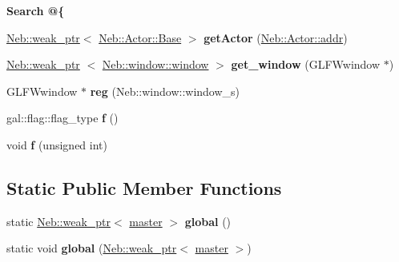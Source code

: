 \begin{Indent}{\bf \-Search @\{}\par
\begin{DoxyCompactItemize}
\item 
\hypertarget{classNeb_1_1master_a5e904cfb101128c317df8ae8909a76d0}{\hyperlink{classNeb_1_1weak__ptr}{\-Neb\-::weak\-\_\-ptr}$<$ \hyperlink{classNeb_1_1Actor_1_1Base}{\-Neb\-::\-Actor\-::\-Base} $>$ {\bfseries get\-Actor} (\hyperlink{classNeb_1_1Actor_1_1addr}{\-Neb\-::\-Actor\-::addr})}\label{classNeb_1_1master_a5e904cfb101128c317df8ae8909a76d0}

\item 
\hypertarget{classNeb_1_1master_a52f234f4ba1485910dc1590f7e0b8c33}{\hyperlink{classNeb_1_1weak__ptr}{\-Neb\-::weak\-\_\-ptr}\*
$<$ \hyperlink{classNeb_1_1window_1_1window}{\-Neb\-::window\-::window} $>$ {\bfseries get\-\_\-window} (\-G\-L\-F\-Wwindow $\ast$)}\label{classNeb_1_1master_a52f234f4ba1485910dc1590f7e0b8c33}

\item 
\hypertarget{classNeb_1_1master_a6548ef5ff871fec6dc28d3b3fa44c159}{\-G\-L\-F\-Wwindow $\ast$ {\bfseries reg} (\-Neb\-::window\-::window\-\_\-s)}\label{classNeb_1_1master_a6548ef5ff871fec6dc28d3b3fa44c159}

\item 
\hypertarget{classNeb_1_1master_a4ccf2ce1e6c39834544f2a015a7f2b7f}{gal\-::flag\-::flag\-\_\-type {\bfseries f} ()}\label{classNeb_1_1master_a4ccf2ce1e6c39834544f2a015a7f2b7f}

\item 
\hypertarget{classNeb_1_1master_aae9419e976bd48f05bbb86d820d30b95}{void {\bfseries f} (unsigned int)}\label{classNeb_1_1master_aae9419e976bd48f05bbb86d820d30b95}

\end{DoxyCompactItemize}
\end{Indent}
\subsection*{\-Static \-Public \-Member \-Functions}
\begin{DoxyCompactItemize}
\item 
\hypertarget{classNeb_1_1master_a7537ce2190a19fc5aa7d3cc505c33ad2}{static \hyperlink{classNeb_1_1weak__ptr}{\-Neb\-::weak\-\_\-ptr}$<$ \hyperlink{classNeb_1_1master}{master} $>$ {\bfseries global} ()}\label{classNeb_1_1master_a7537ce2190a19fc5aa7d3cc505c33ad2}

\item 
\hypertarget{classNeb_1_1master_a649f1435a3b08187a071f5759b5695b4}{static void {\bfseries global} (\hyperlink{classNeb_1_1weak__ptr}{\-Neb\-::weak\-\_\-ptr}$<$ \hyperlink{classNeb_1_1master}{master} $>$)}\label{classNeb_1_1master_a649f1435a3b08187a071f5759b5695b4}

\end{DoxyCompactItemize}
